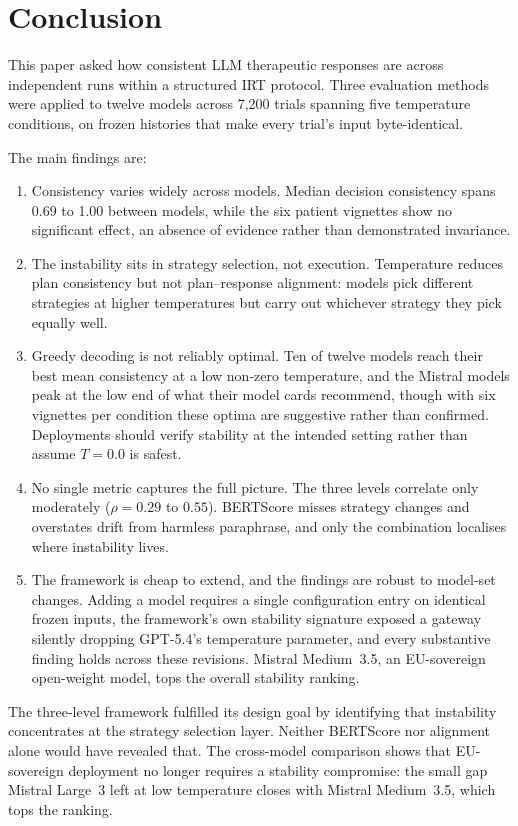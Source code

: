 \section{Conclusion}
\label{sec:conclusion}

This paper asked how consistent LLM therapeutic responses are across independent runs within a structured IRT protocol. Three evaluation methods were applied to twelve models across 7{,}200 trials spanning five temperature conditions, on frozen histories that make every trial's input byte-identical.

The main findings are:

\begin{enumerate}
  \item Consistency varies widely across models. Median decision consistency spans 0.69 to 1.00 between models, while the six patient vignettes show no significant effect, an absence of evidence rather than demonstrated invariance.
  \item The instability sits in strategy selection, not execution. Temperature reduces plan consistency but not plan--response alignment: models pick different strategies at higher temperatures but carry out whichever strategy they pick equally well.
  \item Greedy decoding is not reliably optimal. Ten of twelve models reach their best mean consistency at a low non-zero temperature, and the Mistral models peak at the low end of what their model cards recommend, though with six vignettes per condition these optima are suggestive rather than confirmed. Deployments should verify stability at the intended setting rather than assume $T{=}0.0$ is safest.
  \item No single metric captures the full picture. The three levels correlate only moderately ($\rho = 0.29$ to $0.55$). BERTScore misses strategy changes and overstates drift from harmless paraphrase, and only the combination localises where instability lives.
  \item The framework is cheap to extend, and the findings are robust to model-set changes. Adding a model requires a single configuration entry on identical frozen inputs, the framework's own stability signature exposed a gateway silently dropping GPT-5.4's temperature parameter, and every substantive finding holds across these revisions. Mistral Medium~3.5, an EU-sovereign open-weight model, tops the overall stability ranking.
\end{enumerate}

The three-level framework fulfilled its design goal by identifying that instability concentrates at the strategy selection layer. Neither BERTScore nor alignment alone would have revealed that. The cross-model comparison shows that EU-sovereign deployment no longer requires a stability compromise: the small gap Mistral Large~3 left at low temperature closes with Mistral Medium~3.5, which tops the ranking.


